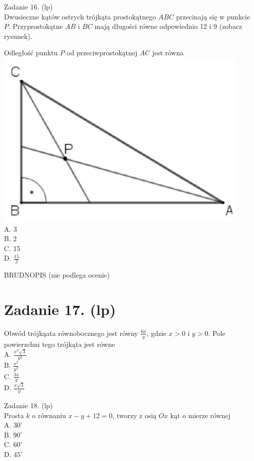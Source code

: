 \documentclass[10pt]{article}
\begin{document}
Zadanie 16. (lp)\\
Dwusieczne kątów ostrych trójkąta prostokątnego \(A B C\) przecinają się w punkcie \(P\). Przyprostokątne \(A B\) i \(B C\) mają długości równe odpowiednio 12 i 9 (zobacz rysunek).

Odległość punktu \(P\) od przeciwprostokątnej \(A C\) jest równa\\
\includegraphics[max width=\textwidth, center]{2024_11_21_c2f4637e26cc7e4291d3g-04}\\
A. 3\\
B. 2\\
C. 15\\
D. \(\frac{15}{2}\)

BRUDNOPIS (nie podlega ocenie)

\section*{Zadanie 17. (lp)}
Obwód trójkąata równobocznego jest równy \(\frac{6 x}{y}\), gdzie \(x>0\) i \(y>0\). Pole powierzchni tego trójkąta jest równe\\
A. \(\frac{x^{2} \sqrt{3}}{y^{2}}\)\\
B. \(\frac{x^{2}}{y^{2}}\)\\
C. \(\frac{3 x}{y}\)\\
D. \(\frac{x \sqrt{3}}{y}\)

Zadanie 18. (lp)\\
Prosta \(k\) o równaniu \(x-y+12=0\), tworzy z osią \(O x\) kąt o mierze równej\\
A. \(30^{\circ}\)\\
B. \(90^{\circ}\)\\
C. \(60^{\circ}\)\\
D. \(45^{\circ}\)
\end{document}
